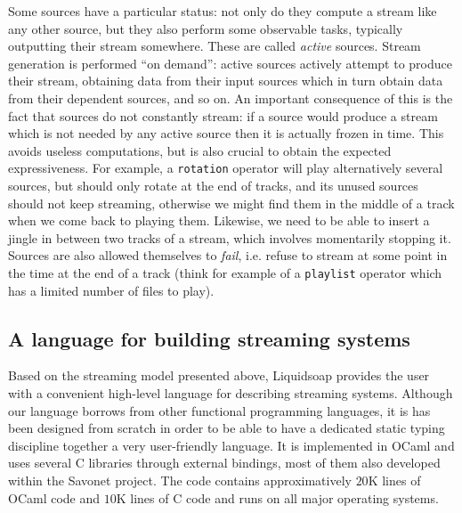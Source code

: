 \documentclass{llncs}
\newcommand{\liquidsoap}{Liquidsoap}
\newcommand{\savonet}{Savonet}
\newcommand{\ie}{{i.e.}}
\begin{document}
Some sources have a particular status: not only do they compute a stream like any
other source, but they also perform some observable tasks, typically outputting
their stream somewhere. These are called \emph{active} sources. Stream
generation is performed ``on demand'': active sources actively attempt to
produce their stream, obtaining data from their input sources which in turn
obtain data from their dependent sources, and so on. An important consequence of
this is the fact that sources do not constantly stream: if a source would
produce a stream which is not needed by any active source then it is actually
frozen in time. This avoids useless computations, but is also crucial to obtain
the expected expressiveness. For example, a \texttt{rotation} operator will play
alternatively several sources, but should only rotate at the end of tracks, and
its unused sources should not keep streaming, otherwise we might find them in
the middle of a track when we come back to playing them. Likewise, we need to be
able to insert a jingle in between two tracks of a stream, which involves
momentarily stopping it. Sources are also allowed themselves to \emph{fail},
\ie{} refuse to stream at some point in the time at the end of a track (think
for example of a \texttt{playlist} operator which has a limited number of files
to play).

\subsection{A language for building streaming systems}

Based on the streaming model presented above, \liquidsoap{} provides the user
with a convenient high-level language for describing streaming systems.
Although our language borrows from other functional programming languages, it is
has been designed from scratch in order to be able to have a dedicated static
typing discipline together a very user-friendly language. 
It is implemented in OCaml and uses several C libraries 
through external bindings, most of them also developed within the 
\savonet{} project. The code contains approximatively $20$K lines of
OCaml code and $10$K lines of C code and runs on all major operating systems.
\end{document}
